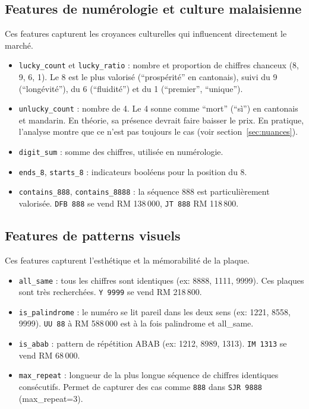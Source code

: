 \documentclass[12pt, a4paper]{article}
\begin{document}
\subsection{Features de numérologie et culture malaisienne}

Ces features capturent les croyances culturelles qui influencent directement le marché.

\begin{itemize}
  \item \texttt{lucky\_count} et \texttt{lucky\_ratio} : nombre et proportion de chiffres chanceux (8, 9, 6, 1). Le 8 est le plus valorisé (``prospérité'' en cantonais), suivi du 9 (``longévité''), du 6 (``fluidité'') et du 1 (``premier'', ``unique'').
  \item \texttt{unlucky\_count} : nombre de 4. Le 4 sonne comme ``mort'' (``sì'') en cantonais et mandarin. En théorie, sa présence devrait faire baisser le prix. En pratique, l'analyse montre que ce n'est pas toujours le cas (voir section~\ref{sec:nuances}).
  \item \texttt{digit\_sum} : somme des chiffres, utilisée en numérologie.
  \item \texttt{ends\_8}, \texttt{starts\_8} : indicateurs booléens pour la position du 8.
  \item \texttt{contains\_888}, \texttt{contains\_8888} : la séquence 888 est particulièrement valorisée. \texttt{DFB 888} se vend RM 138\,000, \texttt{JT 888} RM 118\,800.
\end{itemize}

\subsection{Features de patterns visuels}

Ces features capturent l'esthétique et la mémorabilité de la plaque.

\begin{itemize}
  \item \texttt{all\_same} : tous les chiffres sont identiques (ex: 8888, 1111, 9999). Ces plaques sont très recherchées. \texttt{Y 9999} se vend RM 218\,800.
  \item \texttt{is\_palindrome} : le numéro se lit pareil dans les deux sens (ex: 1221, 8558, 9999). \texttt{UU 88} à RM 588\,000 est à la fois palindrome et all\_same.
  \item \texttt{is\_abab} : pattern de répétition ABAB (ex: 1212, 8989, 1313). \texttt{IM 1313} se vend RM 68\,000.
  \item \texttt{max\_repeat} : longueur de la plus longue séquence de chiffres identiques consécutifs. Permet de capturer des cas comme \texttt{888} dans \texttt{SJR 9888} (max\_repeat=3).
\end{itemize}
\end{document}
